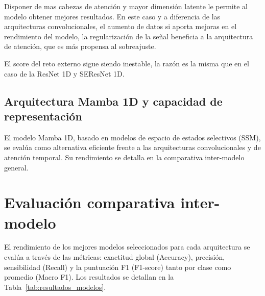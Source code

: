 Disponer de mas cabezas de atención y mayor dimensión latente le permite al modelo obtener mejores resultados. En este caso
y a diferencia de las arquitecturas convolucionales, el aumento de datos si aporta mejoras en el rendimiento del modelo,
la regularización de la señal beneficia a la arquitectura de atención, que es más propensa al sobreajuste.

El score del reto externo sigue siendo inestable, la razón es la misma que en el caso de la ResNet 1D y SEResNet 1D.

\subsection{Arquitectura Mamba 1D y capacidad de representación}
\label{subsec:resultados_mamba}

El modelo Mamba 1D, basado en modelos de espacio de estados selectivos (SSM),
se evalúa como alternativa eficiente frente a las arquitecturas convolucionales y
de atención temporal. Su rendimiento se detalla en la comparativa inter-modelo
general.

\section{Evaluación comparativa inter-modelo}
\label{sec:evaluacion_cuantitativa}

El rendimiento de los mejores modelos seleccionados para cada arquitectura se evalúa a
través de las métricas: exactitud global (Accuracy), precisión, sensibilidad (Recall) y
la puntuación F1 (F1-score) tanto por clase como promedio (Macro F1).
Los resultados se detallan en la Tabla~\ref{tab:resultados_modelos}.

